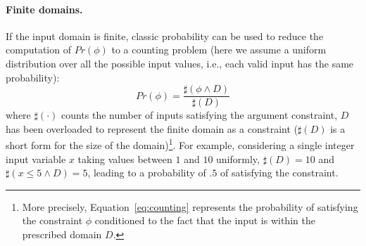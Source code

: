 %		

\paragraph{Finite domains.} 

If the input domain is finite, classic probability can be used to reduce the computation of $Pr(\phi)$ to a counting problem (here we assume a uniform distribution over all the possible input values, i.e., each valid input has the same probability):
%
\begin{equation}\label{eq:counting}
	Pr(\phi) = \frac{\sharp(\phi \land D)}{\sharp(D)}
\end{equation}
%
\noindent where $\sharp(\cdot)$ counts the number of inputs satisfying the argument constraint, $D$ has been overloaded to represent the finite domain as a constraint ($\sharp(D)$ is a short form for the size of the domain)\footnote{More precisely, Equation~\eqref{eq:counting} represents the probability of satisfying the constraint $\phi$ conditioned to the fact that the input is within the prescribed domain $D$.}. For example, considering a single integer input variable $x$ taking values between $1$ and $10$ uniformly, $\sharp(D)=10$ and $\sharp(x\leq5 \land D)=5$, leading to a probability of $.5$ of satisfying the constraint.

